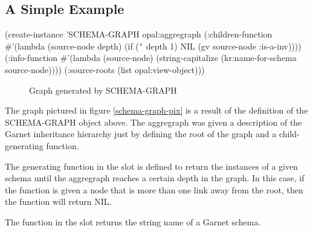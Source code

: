 \begin{group}
\subsection{A Simple Example}
\vspace{1 line}

\begin{programexample}
(create-instance 'SCHEMA-GRAPH opal:aggregraph
   (:children-function \#'(lambda (source-node depth)
			   (if ({\tt\char`\>} depth 1)
			       NIL
			       (gv source-node :is-a-inv))))
   (:info-function \#'(lambda (source-node)
		       (string-capitalize
			(kr:name-for-schema source-node))))
   (:source-roots (list opal:view-object)))
\end{programexample}
\end{group}

\begin{figure}
\begin{center}
\end{center}
\caption{Graph generated by SCHEMA-GRAPH}
\end{figure}

The graph pictured in figure \ref{schema-graph-pix} is a result of the
definition of the SCHEMA-GRAPH object above.  The aggregraph was given
a description of the Garnet inheritance hierarchy just by defining the root
of the graph and a child-generating function.

The generating function in the  slot is defined to
return the instances of a given schema until the aggregraph reaches a certain
depth in the graph.  In this case, if the function is given a node that is
more than one link away from the root, then the function will return NIL.

The function in the  slot returns the string name of
a Garnet schema.


